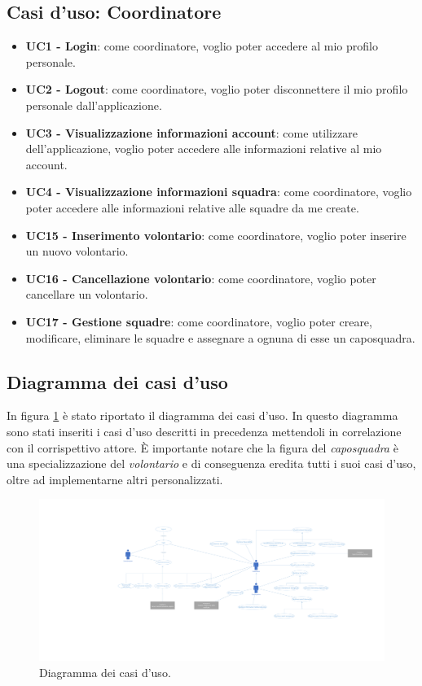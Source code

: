 \subsection{Casi d'uso: Coordinatore}
\begin{itemize}
	\item \textbf{UC1 - Login}:
	come coordinatore, voglio poter accedere al mio profilo personale.
	
	\item \textbf{UC2 - Logout}:
	come coordinatore, voglio poter disconnettere il mio profilo personale dall'applicazione.
	
	\item \textbf{UC3 - Visualizzazione informazioni account}:
	come utilizzare dell'applicazione, voglio poter accedere alle informazioni relative al mio account.
	
	\item \textbf{UC4 - Visualizzazione informazioni squadra}:
	come coordinatore, voglio poter accedere alle informazioni relative alle squadre da me create.
	
	\item \textbf{UC15 - Inserimento volontario}:
	come coordinatore, voglio poter inserire un nuovo volontario.
	
	\item \textbf{UC16 - Cancellazione volontario}:
	come coordinatore, voglio poter cancellare un volontario.
	
	\item \textbf{UC17 - Gestione squadre}:
	come coordinatore, voglio poter creare, modificare, eliminare le squadre e assegnare a ognuna di esse un caposquadra.
\end{itemize}

\clearpage
\subsection{Diagramma dei casi d'uso}
In figura \ref{fig:UseCaseDiagram} è stato riportato il diagramma dei casi d'uso. In questo diagramma sono stati inseriti i casi d'uso descritti in precedenza mettendoli in correlazione con il corrispettivo attore. È importante notare che la figura del \textit{caposquadra} è una specializzazione del \textit{volontario} e di conseguenza eredita tutti i suoi casi d'uso, oltre ad implementarne altri personalizzati. 

\begin{figure}
	\centering
	\includegraphics[width=1\linewidth]{./Iterazione 0/OtherFiles/Use cases diagram}
	\caption{Diagramma dei casi d'uso.}
	\label{fig:UseCaseDiagram}
\end{figure}


